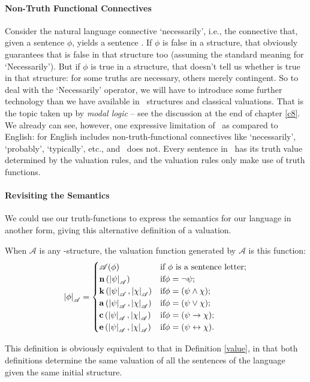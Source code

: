 \paragraph{Non-Truth Functional Connectives} Consider the natural language connective `necessarily', i.e., the connective that, given a sentence $\phi$, yields a sentence . If $\phi$ is false in a structure, that obviously guarantees that  is false in that structure too (assuming the standard meaning for ‘Necessarily’). But if $\phi$ is true in a structure, that doesn't tell us whether  is true in that structure: for some truths are necessary, others merely contingent. So to deal with the `Necessarily' operator, we will have to introduce some further technology than we have available in \lone\ structures and classical valuations. That is the topic taken up by \emph{modal logic} – see the discussion at the end of chapter \ref{c8}. We already can see, however, one expressive limitation of \lone\ as compared to English: for English includes non-truth-functional connectives like `necessarily', `probably', `typically', etc., and \lone\ does not. Every sentence in \lone\ has its truth value determined by the valuation rules, and the valuation rules only make use of truth functions.

\paragraph{Revisiting the Semantics} We could use our truth-functions to express the semantics for our language in another form, giving this alternative definition of a valuation. \begin{definition}
	When $\mathscr{A}$ is any \lone-structure, the valuation function generated by $\mathscr{A}$ is this function\label{val2}: $$\left|\phi\right|_{\mathscr{A}} = \begin{cases}
		\mathscr{A}(\phi) &\text{if $\phi$ is a sentence letter};\\
		\mathbf{n}\left(\left|\psi\right|_{\mathscr{A}}\right) &\text{if} \phi = \neg\psi;\\
		\mathbf{k}\left(\left|\psi\right|_{\mathscr{A}},\left|\chi\right|_{\mathscr{A}}\right) &\text{if} \phi = (\psi \wedge \chi);\\ 
		\mathbf{a}\left(\left|\psi\right|_{\mathscr{A}},\left|\chi\right|_{\mathscr{A}}\right) &\text{if} \phi = (\psi \vee \chi);\\
		\mathbf{c}\left(\left|\psi\right|_{\mathscr{A}},\left|\chi\right|_{\mathscr{A}}\right) &\text{if} \phi = (\psi \to \chi);\\
		\mathbf{e}\left(\left|\psi\right|_{\mathscr{A}},\left|\chi\right|_{\mathscr{A}}\right) &\text{if} \phi = (\psi \leftrightarrow \chi).\\ 
	\end{cases}$$
\end{definition} This definition is obviously equivalent to that in Definition \ref{value}, in that both definitions determine the same valuation of all the sentences of the language given the same initial structure.





